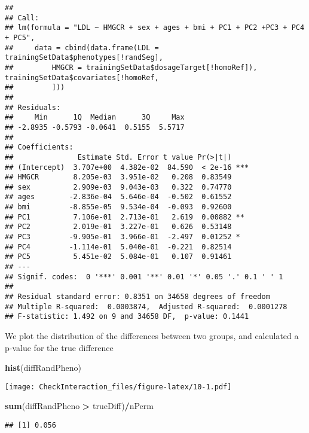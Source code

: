 \documentclass[]{article}
\newenvironment{Shaded}{\begin{snugshade}}{\end{snugshade}}
\newcommand{\KeywordTok}[1]{\textcolor[rgb]{0.13,0.29,0.53}{\textbf{#1}}}
\newcommand{\StringTok}[1]{\textcolor[rgb]{0.31,0.60,0.02}{#1}}
\newcommand{\OperatorTok}[1]{\textcolor[rgb]{0.81,0.36,0.00}{\textbf{#1}}}
\newcommand{\NormalTok}[1]{#1}
\begin{document}
\begin{verbatim}
## 
## Call:
## lm(formula = "LDL ~ HMGCR + sex + ages + bmi + PC1 + PC2 +PC3 + PC4 + PC5", 
##     data = cbind(data.frame(LDL = trainingSetData$phenotypes[!randSeg], 
##         HMGCR = trainingSetData$dosageTarget[!homoRef]), trainingSetData$covariates[!homoRef, 
##         ]))
## 
## Residuals:
##     Min      1Q  Median      3Q     Max 
## -2.8935 -0.5793 -0.0641  0.5155  5.5717 
## 
## Coefficients:
##               Estimate Std. Error t value Pr(>|t|)    
## (Intercept)  3.707e+00  4.382e-02  84.590  < 2e-16 ***
## HMGCR        8.205e-03  3.951e-02   0.208  0.83549    
## sex          2.909e-03  9.043e-03   0.322  0.74770    
## ages        -2.836e-04  5.646e-04  -0.502  0.61552    
## bmi         -8.855e-05  9.534e-04  -0.093  0.92600    
## PC1          7.106e-01  2.713e-01   2.619  0.00882 ** 
## PC2          2.019e-01  3.227e-01   0.626  0.53148    
## PC3         -9.905e-01  3.966e-01  -2.497  0.01252 *  
## PC4         -1.114e-01  5.040e-01  -0.221  0.82514    
## PC5          5.451e-02  5.084e-01   0.107  0.91461    
## ---
## Signif. codes:  0 '***' 0.001 '**' 0.01 '*' 0.05 '.' 0.1 ' ' 1
## 
## Residual standard error: 0.8351 on 34658 degrees of freedom
## Multiple R-squared:  0.0003874,  Adjusted R-squared:  0.0001278 
## F-statistic: 1.492 on 9 and 34658 DF,  p-value: 0.1441
\end{verbatim}

We plot the distribution of the differences between two groups, and
calculated a p-value for the true difference

\begin{Shaded}
\begin{Highlighting}[]
\KeywordTok{hist}\NormalTok{(diffRandPheno)}
\end{Highlighting}
\end{Shaded}

\texttt{[image: CheckInteraction\_files/figure-latex/10-1.pdf]}

\begin{Shaded}
\begin{Highlighting}[]
\KeywordTok{sum}\NormalTok{(diffRandPheno }\OperatorTok{>}\StringTok{ }\NormalTok{trueDiff)}\OperatorTok{/}\NormalTok{nPerm}
\end{Highlighting}
\end{Shaded}

\begin{verbatim}
## [1] 0.056
\end{verbatim}
\end{document}
